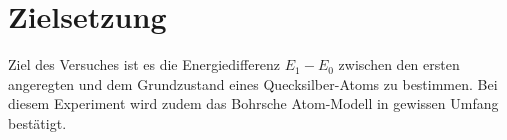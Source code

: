 \section{Zielsetzung}
\label{sec:zielsetzung}
Ziel des Versuches ist es die Energiedifferenz $E_1 - E_0$ zwischen den ersten angeregten und dem Grundzustand eines 
Quecksilber-Atoms zu bestimmen. Bei diesem Experiment wird zudem das Bohrsche Atom-Modell in gewissen Umfang bestätigt.